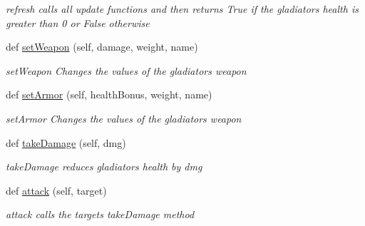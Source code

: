 \begin{DoxyCompactItemize}
\begin{DoxyCompactList}\small\item\em refresh calls all update functions and then returns True if the gladiator\textquotesingle{}s health is greater than 0 or False otherwise \end{DoxyCompactList}\item 
def \hyperlink{classGladiator_1_1Gladiator_a06277c2f3b96691a9d87fa1006d42604}{set\+Weapon} (self, damage, weight, name)
\begin{DoxyCompactList}\small\item\em set\+Weapon Changes the values of the gladiator\textquotesingle{}s weapon \end{DoxyCompactList}\item 
def \hyperlink{classGladiator_1_1Gladiator_af45fc0044c3971a2364b99a8db3d4d52}{set\+Armor} (self, health\+Bonus, weight, name)
\begin{DoxyCompactList}\small\item\em set\+Armor Changes the values of the gladiator\textquotesingle{}s weapon \end{DoxyCompactList}\item 
def \hyperlink{classGladiator_1_1Gladiator_a5fc86866dd3478ce049867c561e54084}{take\+Damage} (self, dmg)
\begin{DoxyCompactList}\small\item\em take\+Damage reduces gladiator\textquotesingle{}s health by dmg \end{DoxyCompactList}\item 
def \hyperlink{classGladiator_1_1Gladiator_a0bbe9e689bc1e66a85ebaea064a61233}{attack} (self, target)
\begin{DoxyCompactList}\small\item\em attack calls the target\textquotesingle{}s take\+Damage method \end{DoxyCompactList}\end{DoxyCompactItemize}
